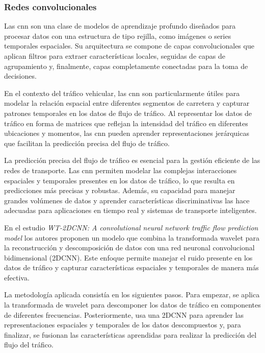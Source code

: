 \subsubsection{Redes convolucionales}

Las \acrlong{cnn} son una clase de modelos de aprendizaje profundo diseñados para procesar datos con una estructura de tipo rejilla, como imágenes o series temporales espaciales. Su arquitectura se compone de capas convolucionales que aplican filtros para extraer características locales, seguidas de capas de agrupamiento y, finalmente, capas completamente conectadas para la toma de decisiones.​

En el contexto del tráfico vehicular, las \acrshort{cnn} son particularmente útiles para modelar la relación espacial entre diferentes segmentos de carretera y capturar patrones temporales en los datos de flujo de tráfico. Al representar los datos de tráfico en forma de matrices que reflejan la intensidad del tráfico en diferentes ubicaciones y momentos, las \acrshort{cnn} pueden aprender representaciones jerárquicas que facilitan la predicción precisa del flujo de tráfico.

La predicción precisa del flujo de tráfico es esencial para la gestión eficiente de las redes de transporte. Las \acrshort{cnn} permiten modelar las complejas interacciones espaciales y temporales presentes en los datos de tráfico, lo que resulta en predicciones más precisas y robustas. Además, su capacidad para manejar grandes volúmenes de datos y aprender características discriminativas las hace adecuadas para aplicaciones en tiempo real y sistemas de transporte inteligentes.

En el estudio \textit{WT-2DCNN: A convolutional neural network traffic flow prediction model} los autores \cite{forecastCnnWavelet} proponen un modelo que combina la transformada wavelet para la reconstrucción y descomposición de datos con una red neuronal convolucional bidimensional (2DCNN). Este enfoque permite manejar el ruido presente en los datos de tráfico y capturar características espaciales y temporales de manera más efectiva.​

La metodología aplicada consistía en los siguientes pasos. Para empezar, se aplica la transformada de wavelet para descomponer los datos de tráfico en componentes de diferentes frecuencias. Posteriormente, usa una 2DCNN para aprender las representaciones espaciales y temporales de los datos descompuestos y, para finalizar, se fusionan las características aprendidas para realizar la predicción del flujo del tráfico.

